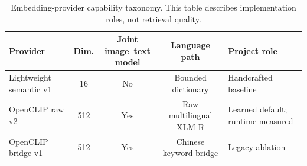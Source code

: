 \begin{table}[t]
\centering
\caption{Embedding-provider capability taxonomy. This table describes implementation roles, not retrieval quality.}
\label{tab:embedding-provider-taxonomy}
\begin{tabular}{lcccl}
\toprule
Provider & Dim. & Joint image--text model & Language path & Project role \\
\midrule
Lightweight semantic v1 & 16 & No & Bounded dictionary & Handcrafted baseline \\
OpenCLIP raw v2 & 512 & Yes & Raw multilingual XLM-R & Learned default; runtime measured \\
OpenCLIP bridge v1 & 512 & Yes & Chinese keyword bridge & Legacy ablation \\
\bottomrule
\end{tabular}
\end{table}
